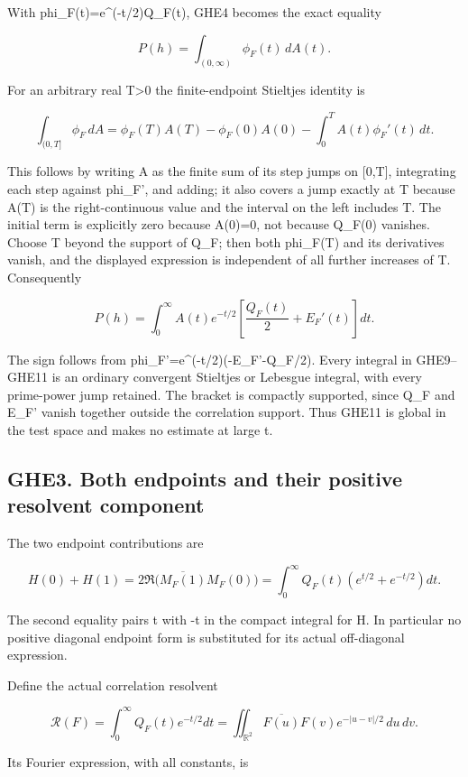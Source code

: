 With phi\_F(t)=e\^{}(-t/2)Q\_F(t), GHE4 becomes the exact equality

\[
P(h)=\int_{(0,\infty)}\phi_F(t)\,dA(t).
\tag{GHE9}
\]

For an arbitrary real T\textgreater0 the finite-endpoint Stieltjes
identity is

\[
\int_{(0,T]}\phi_F\,dA
=\phi_F(T)A(T)-\phi_F(0)A(0)
-\int_0^T A(t)\phi_F'(t)\,dt.
\tag{GHE10}
\]

This follows by writing A as the finite sum of its step jumps on
{[}0,T{]}, integrating each step against phi\_F', and adding; it also
covers a jump exactly at T because A(T) is the right-continuous value
and the interval on the left includes T. The initial term is explicitly
zero because A(0)=0, not because Q\_F(0) vanishes. Choose T beyond the
support of Q\_F; then both phi\_F(T) and its derivatives vanish, and the
displayed expression is independent of all further increases of T.
Consequently

\[
\boxed{P(h)=\int_0^\infty A(t)e^{-t/2}
\left[\frac{Q_F(t)}2+E_F'(t)\right]dt.}
\tag{GHE11}
\]

The sign follows from phi\_F'=e\^{}(-t/2)(-E\_F'-Q\_F/2). Every integral
in GHE9--GHE11 is an ordinary convergent Stieltjes or Lebesgue integral,
with every prime-power jump retained. The bracket is compactly
supported, since Q\_F and E\_F' vanish together outside the correlation
support. Thus GHE11 is global in the test space and makes no estimate at
large t.

\subsection{GHE3. Both endpoints and their positive resolvent
component}\label{ghe3.-both-endpoints-and-their-positive-resolvent-component}

The two endpoint contributions are

\[
H(0)+H(1)=2\Re\big(\overline{M_F(1)}M_F(0)\big)
=\int_0^\infty Q_F(t)(e^{t/2}+e^{-t/2})dt.
\tag{GHE12}
\]

The second equality pairs t with -t in the compact integral for H. In
particular no positive diagonal endpoint form is substituted for its
actual off-diagonal expression.

Define the actual correlation resolvent

\[
\mathcal R(F)=\int_0^\infty Q_F(t)e^{-t/2}dt
=\iint_{\mathbb R^2}\overline{F(u)}F(v)e^{-|u-v|/2}\,du\,dv.
\tag{GHE13}
\]

Its Fourier expression, with all constants, is

